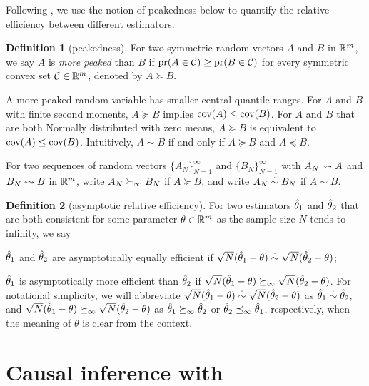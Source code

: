 \documentclass[11pt]{article}
\theoremstyle{definition}
\newtheorem{definition}{Definition}
\begin{document}
Following \cite{AOS}, we use the notion of peakedness \citep{sherman} below to quantify the relative efficiency between different estimators.

\begin{definition}[peakedness] %
\label{def:peakedness}
For two symmetric random vectors $A$ and $B$ in $\mathbb R^m $, we say $A$ is {\it more peaked} than $B$ if ${\rm pr}(A\in \mathcal C) \geq {\rm pr}(B \in \mathcal C)$ for every symmetric convex set $\mathcal C \in \mathbb R^m $, denoted by $A \succeq B$. 
\end{definition}

A more peaked random variable has smaller central quantile ranges.
For $A$ and $B$ with finite second moments, $A \succeq B$ implies $\text{cov}(A) \leq \text{cov}(B)$. 
For $A$ and $B$ that are both Normally distributed with zero means, $A \succeq B$ is equivalent to $\text{cov}(A) \leq \text{cov}(B)$. 
Intuitively, $A \sim B$  if and only if $A \succeq B$ and $A \preceq B$. 

For two sequences of random vectors $\{A_N\}_{N=1}^\infty$ and $\{B_N\}_{N=1}^\infty$ with $A_N\rightsquigarrow A$ and $B_N\rightsquigarrow B$ in $\mathbb R^m $, write $A_N \succeq_\infty B_N$ if $A \succeq B$, and write $A_N \overset{\cdot}{\sim} B_N$ if $A \sim B$.


\begin{definition}[asymptotic relative efficiency]
For two estimators $\hat\theta_1$ and $\hat\theta_2$ that are both consistent for some parameter $\theta \in \mathbb R^m$ as the sample size $N$ tends to infinity, we say 
\begine[(i)]
\item $\hat\theta_1$ and $\hat\theta_2$ are asymptotically equally efficient if $\sqrt N (\hat\theta_1 - \theta) \overset{\cdot}{\sim} \sqrt N (\hat\theta_2 - \theta)$; 
\item $\hat\theta_1$ is asymptotically more efficient than $\hat\theta_2$ if $\sqrt N (\hat\theta_1 - \theta) \succeq_\infty \sqrt N (\hat\theta_2 - \theta)$. 
\ende 
For notational simplicity, we will abbreviate 
$\sqrt N (\hat\theta_1 - \theta) \overset{\cdot}{\sim} \sqrt N (\hat\theta_2 - \theta)$ as $\hat\theta_1 \overset{\cdot}{\sim} \hat\theta_2$, and
$\sqrt N (\hat\theta_1 - \theta) \succeq_\infty \sqrt N (\hat\theta_2 - \theta)$ as $\hat\theta_1 \succeq_\infty \hat\theta_2$ or $\hat\theta_2\preceq_\infty\hat\theta_1$, respectively, when the meaning of $\theta$ is clear from the context. 
\end{definition}
 


\section{Causal inference with \mes}\label{sec:setup}
\end{document}
